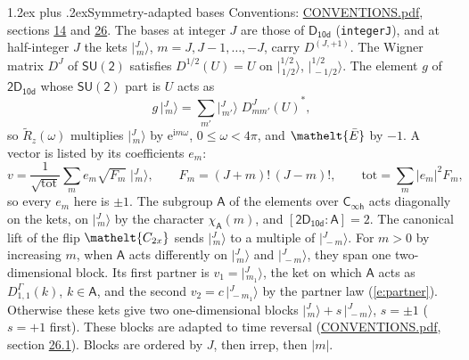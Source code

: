 \documentclass[10pt,a4paper]{article}
\makeatletter
\renewcommand\section{\@startsection{section}{1}{\z@}{-3ex plus -1ex minus -.2ex}%
  {1.2ex plus .2ex}{\normalfont\large\sffamily\bfseries\color{parttitle}}}
\numberwithin{equation}{section}
\newcommand{\eltfont}[1]{{\let\sigma\eltsigma\mathelt{#1}}}
\newcommand{\grp}[1]{\mathsf{#1}}
\newcommand{\elt}[1]{\eltfont{#1}}
\newcommand{\grpindex}[2]{[#1 : #2]}
\newcommand{\iunit}{\mathrm{i}}
\newcommand{\expe}{\mathrm{e}}
\newcommand{\irrJp}[2]{D^{(#1,#2)}}
\newcommand{\repD}[1]{D^{#1}}
\newcommand{\wignerD}[1]{D^{#1}}
\newcommand{\chiA}{\chi_{\grp{A}}}
\newcommand{\conj}[1]{{#1}^{*}}
\newcommand{\jm}[2]{\bigl\lvert{}^{#1}_{\,#2}\bigr\rangle}
\newcommand{\barred}[1]{\bar{#1}}
\newcommand{\lift}[1]{\tilde{#1}}
\makeatother
\begin{document}
\section{Symmetry-adapted bases}\label{s:bases}
Conventions: \href{../../CONVENTIONS.pdf}{CONVENTIONS.pdf}, sections \href{../../../rotation/CONVENTIONS.pdf\#conv.14}{14} and \href{../../CONVENTIONS.pdf\#conv.26}{26}.
\leavevmode\label{n:index.m}\label{n:vector.ket}The bases at integer $J$ are those of \href{../../../rotation/data/pdf/D10d.pdf}{$\grp{D_{10d}}$} (\texttt{integerJ}), and at half-integer $J$ the kets $\jm{J}{m}$, $m = J, J-1, \dots, -J$, carry $\irrJp{J}{+1}$. \label{n:matrix.wigner}The Wigner matrix $\wignerD{J}$ of $\grp{SU(2)}$ satisfies $\wignerD{1/2}(U) = U$ on $\jm{1/2}{1/2}$, $\jm{1/2}{-1/2}$. The element $g$ of $\grp{2D_{10d}}$ whose $\grp{SU(2)}$ part is $U$ acts as
\begin{equation}\label{e:action}g\,\jm{J}{m} = \sum_{m'} \jm{J}{m'}\; \conj{\wignerD{J}_{m m'}(U)},\end{equation}
so $\lift{R}_{z}(\omega)$ multiplies $\jm{J}{m}$ by $\expe^{\iunit m\omega}$, $0 \le \omega < 4\pi$, and $\elt{\barred{E}}$ by $-1$. \label{n:index.ketcoefficient}\label{n:vector.basis.symmetry}\label{n:index.ketweight}\label{n:index.total}A vector is listed by its coefficients $e_m$:
\begin{equation}\label{e:ket}v = \frac{1}{\sqrt{\mathrm{tot}}}\sum_m e_m\sqrt{F_m}\;\jm{J}{m},\qquad F_m = (J+m)!\,(J-m)!,\qquad \mathrm{tot} = \sum_m |e_m|^2F_m,\end{equation}
so every $e_m$ here is $\pm 1$.
\leavevmode\label{n:group.A}\label{n:function.character.abelian}The subgroup $\grp{A}$ of the elements over $\grp{C_{\infty h}}$ acts diagonally on the kets, on $\jm{J}{m}$ by the character $\chiA(m)$, and $\grpindex{\grp{2D_{10d}}}{\grp{A}} = 2$. The canonical lift of the flip $\elt{C_{2x}}$ sends $\jm{J}{m}$ to a multiple of $\jm{J}{-m}$. For $m > 0$ by increasing $m$, when $\grp{A}$ acts differently on $\jm{J}{m}$ and $\jm{J}{-m}$, they span one two-dimensional block. \label{n:index.partner.sign}Its first partner is $v_1 = \jm{J}{m_1}$, the ket on which $\grp{A}$ acts as $\repD{\Gamma}_{1,1}(k)$, $k \in \grp{A}$, and the second $v_2 = c\,\jm{J}{-m_1}$ by the partner law (\ref{e:partner}). \label{n:index.pair.sign}Otherwise these kets give two one-dimensional blocks $\jm{J}{m} + s\,\jm{J}{-m}$, $s = \pm 1$ ($s = +1$ first). These blocks are adapted to time reversal (\href{../../CONVENTIONS.pdf}{CONVENTIONS.pdf}, section \href{../../CONVENTIONS.pdf\#conv.26.1}{26.1}). Blocks are ordered by $J$, then irrep, then $|m|$.
\end{document}
